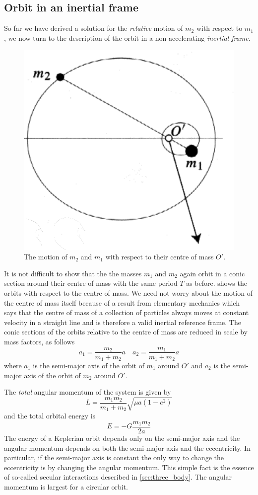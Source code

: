 \subsection{Orbit in an inertial frame}
So far we have derived a solution for the \emph{relative} motion
of $m_2$ with respect to $m_1$, we now turn to the description of the
orbit in a non-accelerating \emph{inertial frame}.
\begin{figure}[htb]
\centering
\includegraphics[width=0.5\linewidth]{gfx/barycentric_orbit.png}
\caption{The motion of $m_2$ and $m_1$ with respect to their centre
    of mass $O'$.}
\label{fig:barycentric_orbit}
\end{figure}
It is not difficult to show that the the masses $m_1$ and $m_2$ again
orbit in a conic section around their centre of mass with the same
period $T$ as before. 
 shows the orbits with respect to the
centre of mass. We need not worry about the motion of the centre
of mass itself because of a result from elementary mechanics which says
that the centre of mass of a collection of particles always moves at
constant velocity in a straight line and is therefore a valid inertial
reference frame. The conic sections of the orbits relative to the centre
of mass are 
reduced in scale by mass factors, as follows
\begin{equation}
    a_1= \frac{m_2}{m_1 + m_2} a\quad a_2= \frac{m_1}{m_1 + m_2} a
\end{equation}
where $a_1$ is the semi-major axis of the orbit of $m_1$ around $O'$
and $a_2$ is the semi-major axis of the orbit of $m_2$ around $O'$.

The \emph{total} angular momentum of the system is given by 
\begin{equation}
    L= \frac{m_1 m_2}{m_1 + m_2} \sqrt{\mu a(1-e^2)}
    \label{eq:ang_momentum}
\end{equation}
and the total orbital energy is
\begin{equation}
    E= -G \frac{m_1 m_2}{2a} 
\end{equation}
The energy of a Keplerian orbit depends only on the semi-major axis
and the angular momentum depends on both the semi-major axis and
the eccentricity. In particular, if the semi-major axis is constant
the only way to change the eccentricity is by changing the angular
momentum. This simple fact is the essence of so-called secular
interactions described in \cref{sec:three_body}. The angular momentum
is largest for a circular orbit.

